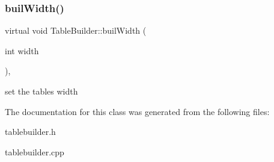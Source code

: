 \subsubsection{\texorpdfstring{buil\+Width()}{builWidth()}}
{\footnotesize\ttfamily virtual void Table\+Builder\+::buil\+Width (\begin{DoxyParamCaption}\item[{int}]{width }\end{DoxyParamCaption})\hspace{0.3cm}{\ttfamily [inline]}, {\ttfamily [virtual]}}

set the table\textquotesingle{}s width 

The documentation for this class was generated from the following files\+:\begin{DoxyCompactItemize}
\item 
tablebuilder.\+h\item 
tablebuilder.\+cpp\end{DoxyCompactItemize}
